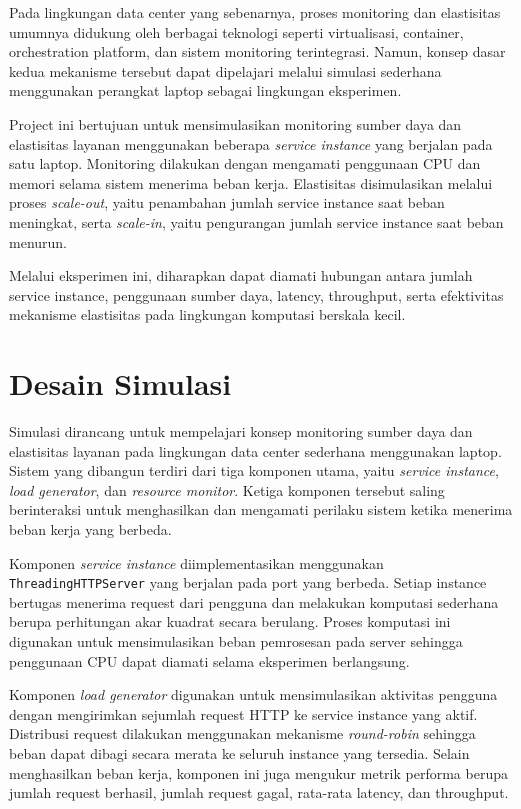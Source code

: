\documentclass[conference]{IEEEtran}
\begin{document}
Pada lingkungan data center yang sebenarnya, proses monitoring dan elastisitas umumnya didukung oleh berbagai teknologi seperti virtualisasi, container, orchestration platform, dan sistem monitoring terintegrasi. Namun, konsep dasar kedua mekanisme tersebut dapat dipelajari melalui simulasi sederhana menggunakan perangkat laptop sebagai lingkungan eksperimen.

Project ini bertujuan untuk mensimulasikan monitoring sumber daya dan elastisitas layanan menggunakan beberapa \textit{service instance} yang berjalan pada satu laptop. Monitoring dilakukan dengan mengamati penggunaan CPU dan memori selama sistem menerima beban kerja. Elastisitas disimulasikan melalui proses \textit{scale-out}, yaitu penambahan jumlah service instance saat beban meningkat, serta \textit{scale-in}, yaitu pengurangan jumlah service instance saat beban menurun.

Melalui eksperimen ini, diharapkan dapat diamati hubungan antara jumlah service instance, penggunaan sumber daya, latency, throughput, serta efektivitas mekanisme elastisitas pada lingkungan komputasi berskala kecil.

\section{Desain Simulasi}
Simulasi dirancang untuk mempelajari konsep monitoring sumber daya dan elastisitas layanan pada lingkungan data center sederhana menggunakan laptop. Sistem yang dibangun terdiri dari tiga komponen utama, yaitu \textit{service instance}, \textit{load generator}, dan \textit{resource monitor}. Ketiga komponen tersebut saling berinteraksi untuk menghasilkan dan mengamati perilaku sistem ketika menerima beban kerja yang berbeda.

Komponen \textit{service instance} diimplementasikan menggunakan \texttt{ThreadingHTTPServer} yang berjalan pada port yang berbeda. Setiap instance bertugas menerima request dari pengguna dan melakukan komputasi sederhana berupa perhitungan akar kuadrat secara berulang. Proses komputasi ini digunakan untuk mensimulasikan beban pemrosesan pada server sehingga penggunaan CPU dapat diamati selama eksperimen berlangsung.

Komponen \textit{load generator} digunakan untuk mensimulasikan aktivitas pengguna dengan mengirimkan sejumlah request HTTP ke service instance yang aktif. Distribusi request dilakukan menggunakan mekanisme \textit{round-robin} sehingga beban dapat dibagi secara merata ke seluruh instance yang tersedia. Selain menghasilkan beban kerja, komponen ini juga mengukur metrik performa berupa jumlah request berhasil, jumlah request gagal, rata-rata latency, dan throughput.
\end{document}
